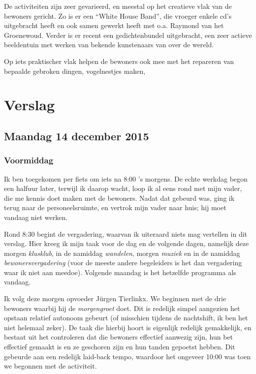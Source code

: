 \documentclass[a4paper,12pt]{article}
\begin{document}
De activiteiten zijn zeer gevarieerd, en meestal op het creatieve vlak van de bewoners gericht. Zo is er een ``White House Band'', die vroeger enkele cd's uitgebracht heeft en ook samen gewerkt heeft met o.a. Raymond van het Groenewoud. Verder is er recent een gedichtenbundel uitgebracht, een zeer actieve beeldentuin met werken van bekende kunstenaars van over de wereld.

Op iets praktischer vlak helpen de bewoners ook mee met het repareren van bepaalde gebroken dingen, vogelnestjes maken,

\section{Verslag}


\subsection{Maandag 14 december 2015}

\subsubsection{Voormiddag}

Ik ben toegekomen per fiets om iets na 8:00 's morgens. De echte werkdag begon een halfuur later, terwijl ik daarop wacht, loop ik al eens rond met mijn vader, die me kennis doet maken met de bewoners. Nadat dat gebeurd was, ging ik terug naar de personeelsruimte, en vertrok mijn vader naar huis; hij moet vandaag niet werken.

Rond 8:30 begint de vergadering, waarvan ik uiteraard niets mag vertellen in dit verslag. Hier kreeg ik mijn taak voor de dag en de volgende dagen, namelijk deze morgen \emph{klusklub}, in de namiddag \emph{wandelen}, morgen \emph{muziek} en in de namiddag \emph{bewonersvergadering} (voor de meeste andere begeleiders is het dan vergadering waar ik niet aan meedoe). Volgende maandag is het hetzelfde programma als vandaag.

Ik volg deze morgen opvoeder Jürgen Tierlinkx. We beginnen met de drie bewoners waarbij hij de \emph{morgengroet} doet. Dit is redelijk simpel aangezien het opstaan relatief autonoom gebeurt (of misschien tijdens de nachtshift, ik ben het niet helemaal zeker). De taak die hierbij hoort is eigenlijk redelijk gemakkelijk, en bestaat uit het controleren dat die bewoners effectief aanwezig zijn, hun bet effectief gemaakt is en ze geschoren zijn en hun tanden gepoetst hebben. Dit gebeurde aan een redelijk laid-back tempo, waardoor het ongeveer 10:00 was toen we begonnen met de activiteit.
\end{document}
